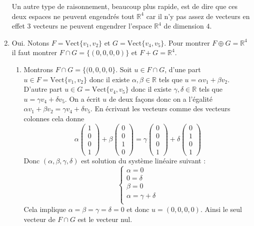 \documentclass[11pt,a4paper]{article}
\newcommand{\Rr}{\mathbb{R}} \newcommand{\R}{\mathbb{R}}
\begin{document}
\begin{enumerate}
\bigskip


Un autre type de raisonnement, beaucoup plus rapide, 
est de dire que ces deux espaces ne peuvent engendr\'es tout $\Rr^4$ 
car il n'y pas assez de vecteurs en effet $3$ vecteurs ne peuvent engendrer 
l'espace $\Rr^4$ de dimension $4$.

\item Oui. Notons $F=\mbox{Vect}\{v_1,v_2\}$ et $G=\mbox{Vect}\{v_4, v_5\}$.
Pour montrer $F \oplus G = \Rr^4$ il faut montrer $F\cap G =\{ (0,0,0,0) \}$ et
$F+G=\Rr^4$.

  \begin{enumerate}
     \item Montrons $F\cap G =\{ (0,0,0,0 \}$. Soit $u \in F\cap G$,
d'une part $u \in F = \mbox{Vect}\{v_1,v_2\}$ donc il existe $\alpha,\beta \in \Rr$ tels que
$u = \alpha v_1+\beta v_2$. D'autre part $u \in G = \mbox{Vect}\{v_4, v_5\}$ donc il existe
$\gamma,\delta \in \Rr$ tels que $u=\gamma v_4 + \delta v_5$. On a écrit $u$ de deux façons donc on a l'égalité
$\alpha v_1+\beta v_2 = \gamma v_4 + \delta v_5$. En écrivant les vecteurs comme des vecteurs colonnes cela donne
$$\alpha \begin{pmatrix} 1 \\ 0 \\ 0 \\1\end{pmatrix}
+ \beta \begin{pmatrix} 0 \\ 0 \\ 1 \\ 0 \end{pmatrix} 
= \gamma \begin{pmatrix} 0 \\ 0 \\ 0 \\1\end{pmatrix} + \delta \begin{pmatrix} 0 \\ 1 \\ 0 \\1\end{pmatrix}$$
Donc $(\alpha,\beta,\gamma,\delta)$ est solution du système linéaire suivant :
$$\begin{cases}
\alpha = 0   \\
0 = \delta \\
\beta = 0 \\
\alpha =  \gamma + \delta \\
\end{cases}
$$
Cela implique $\alpha=\beta=\gamma=\delta=0$ et donc $u = (0,0,0,0)$.
Ainsi le seul vecteur de $F\cap G$ est le vecteur nul.



\end{enumerate}
\end{enumerate}
\end{document}
